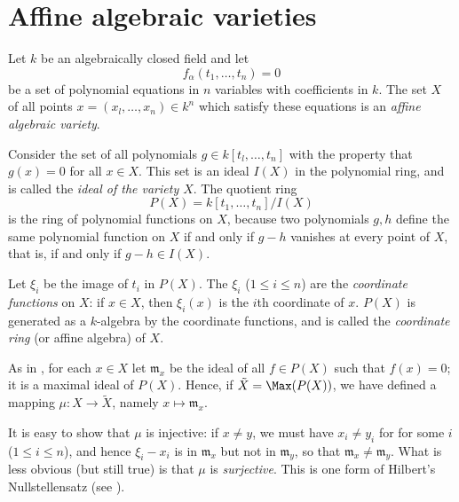 \section{Affine algebraic varieties}

\begin{exercise}
Let \(k\) be an algebraically closed field and let
\begin{equation*}
f_\alpha(t_1, \ldots, t_n) = 0
\end{equation*}
be a set of polynomial equations in \(n\) variables with coefficients in \(k\).
The set \(X\) of all points \(x = (x_l, \ldots, x_n) \in k^n\) which satisfy these equations is an \emph{affine algebraic variety}.

Consider the set of all polynomials \(g \in k[t_l, \ldots, t_n]\) with the property that \(g(x) = 0\) for all \(x \in X\).
This set is an ideal \(I(X)\) in the polynomial ring, and is called the \emph{ideal of the variety \(X\)}.
The quotient ring
\begin{equation*}
P(X) = k[t_1, \ldots, t_n] / I(X)
\end{equation*}
is the ring of polynomial functions on \(X\), because two polynomials \(g, h\) define the same polynomial function on \(X\) if and only if \(g - h\) vanishes at every point of \(X\),
that is, if and only if \(g - h \in I(X)\).

Let \(\xi_i\) be the image of \(t_i\) in \(P(X)\).
The \(\xi_i\) (\(1 \leq i \leq n\)) are the \emph{coordinate functions} on \(X\):
if \(x \in X\), then \(\xi_i(x)\) is the \(i\)th coordinate of \(x\).
\(P(X)\) is generated as a \(k\)-algebra by the coordinate functions, and is called the \emph{coordinate ring} (or affine algebra) of \(X\).

As in , for each \(x \in X\) let \(\mathfrak{m}_x\) be the ideal of all \(f \in P(X)\) such that \(f(x) = 0\);
it is a maximal ideal of \(P(X)\).
Hence, if \(\tilde{X} = \Max(P(X))\), we have defined a mapping \(\mu : X \to \tilde{X}\), namely \(x \mapsto \mathfrak{m}_x\).

It is easy to show that \(\mu\) is injective:
if \(x \neq y\), we must have \(x_i \neq y_i\) for for some \(i\) (\(1 \leq i \leq n\)), and hence \(\xi_i - x_i\) is in \(\mathfrak{m}_x\) but not in \(\mathfrak{m}_y\), so that \(\mathfrak{m}_x \neq \mathfrak{m}_y\).
What is less obvious (but still true) is that \(\mu\) is \emph{surjective}.
This is one form of Hilbert's Nullstellensatz (see ).
\end{exercise}